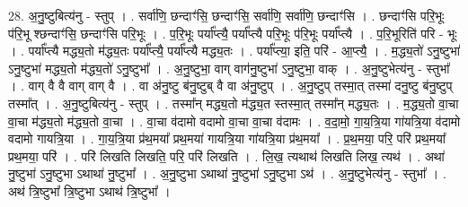 \documentclass[17pt]{extarticle}
\begin{document}
28. अ॒नु॒ष्टुबित्य॑नु - स्तुप् । . सर्वा॑णि॒ छन्दाꣳ॑सि॒ छन्दाꣳ॑सि॒ सर्वा॑णि॒ सर्वा॑णि॒ छन्दाꣳ॑सि । . छन्दाꣳ॑सि परि॒भूः प॑रि॒भू श्छन्दाꣳ॑सि॒ छन्दाꣳ॑सि परि॒भूः । . प॒रि॒भूः पर्या᳚प्त्यै॒ पर्या᳚प्त्यै परि॒भूः प॑रि॒भूः पर्या᳚प्त्यै । . प॒रि॒भूरिति॑ परि - भूः । . पर्या᳚प्त्यै मद्ध्य॒तो म॑द्ध्य॒तः पर्या᳚प्त्यै॒ पर्या᳚प्त्यै मद्ध्य॒तः । . पर्या᳚प्त्या॒ इति॒ परि॑ - आ॒प्त्यै॒ । . म॒द्ध्य॒तो॑ ऽनु॒ष्टुभा॑ ऽनु॒ष्टुभा॑ मद्ध्य॒तो म॑द्ध्य॒तो॑ ऽनु॒ष्टुभा᳚ । . अ॒नु॒ष्टुभा॒ वाग् वाग॑नु॒ष्टुभा॑ ऽनु॒ष्टुभा॒ वाक् । . अ॒नु॒ष्टुभेत्य॑नु - स्तुभा᳚ । . वाग् वै वै वाग् वाग् वै । . वा अ॑नु॒ष्टु ब॑नु॒ष्टुब् वै वा अ॑नु॒ष्टुप् । . अ॒नु॒ष्टुप् तस्मा॒त् तस्मा॑ दनु॒ष्टु ब॑नु॒ष्टुप् तस्मा᳚त् । . अ॒नु॒ष्टुबित्य॑नु - स्तुप् । . तस्मा᳚न् मद्ध्य॒तो म॑द्ध्य॒त स्तस्मा॒त् तस्मा᳚न् मद्ध्य॒तः । . म॒द्ध्य॒तो वा॒चा वा॒चा म॑द्ध्य॒तो म॑द्ध्य॒तो वा॒चा । . वा॒चा व॑दामो वदामो वा॒चा वा॒चा व॑दामः । . व॒दा॒मो॒ गा॒य॒त्रि॒या गा॑यत्रि॒या व॑दामो वदामो गायत्रि॒या । . गा॒य॒त्रि॒या प्र॑थ॒मया᳚ प्रथ॒मया॑ गायत्रि॒या गा॑यत्रि॒या प्र॑थ॒मया᳚ । . प्र॒थ॒मया॒ परि॒ परि॑ प्रथ॒मया᳚ प्रथ॒मया॒ परि॑ । . परि॑ लिखति लिखति॒ परि॒ परि॑ लिखति । . लि॒ख॒ त्यथाथ॑ लिखति लिख॒ त्यथ॑ । . अथा॑ नु॒ष्टुभा॑ ऽनु॒ष्टुभा ऽथाथा॑ नु॒ष्टुभा᳚ । . अ॒नु॒ष्टुभा ऽथाथा॑ नु॒ष्टुभा॑ ऽनु॒ष्टुभा ऽथ॑ । . अ॒नु॒ष्टुभेत्य॑नु - स्तुभा᳚ । . अथ॑ त्रि॒ष्टुभा᳚ त्रि॒ष्टुभा ऽथाथ॑ त्रि॒ष्टुभा᳚ । \newline
\end{document}
